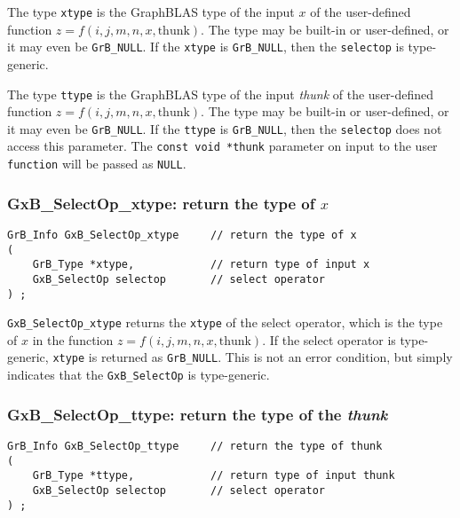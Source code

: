 \documentclass[12pt]{article}
\begin{document}
The type \verb'xtype' is the GraphBLAS type of the input $x$ of the
user-defined function $z=f(i,j,m,n,x,\mbox{thunk})$.  The type may be built-in
or user-defined, or it may even be \verb'GrB_NULL'.  If the \verb'xtype' is
\verb'GrB_NULL', then the \verb'selectop' is type-generic.

The type \verb'ttype' is the GraphBLAS type of the input {\em thunk} of the
user-defined function $z=f(i,j,m,n,x,\mbox{thunk})$.  The type may be built-in
or user-defined, or it may even be \verb'GrB_NULL'.  If the \verb'ttype' is
\verb'GrB_NULL', then the \verb'selectop' does not access this parameter.
The \verb'const void *thunk' parameter on input to the user \verb'function'
will be passed as \verb'NULL'.

\newpage
\subsubsection{{\sf GxB\_SelectOp\_xtype:} return the type of $x$}
\label{selectop_xtype}

\begin{mdframed}[userdefinedwidth=6in]
{\footnotesize
\begin{verbatim}
GrB_Info GxB_SelectOp_xtype     // return the type of x
(
    GrB_Type *xtype,            // return type of input x
    GxB_SelectOp selectop       // select operator
) ;

\end{verbatim}
}\end{mdframed}

\verb'GxB_SelectOp_xtype' returns the \verb'xtype' of the select operator,
which is the type of $x$ in the function $z=f(i,j,m,n,x,\mbox{thunk})$.  If the
select operator is type-generic, \verb'xtype' is returned as \verb'GrB_NULL'.
This is not an error condition, but simply indicates that the
\verb'GxB_SelectOp' is type-generic.

\subsubsection{{\sf GxB\_SelectOp\_ttype:} return the type of the {\em thunk}}
\label{selectop_ttype}

\begin{mdframed}[userdefinedwidth=6in]
{\footnotesize
\begin{verbatim}
GrB_Info GxB_SelectOp_ttype     // return the type of thunk
(
    GrB_Type *ttype,            // return type of input thunk
    GxB_SelectOp selectop       // select operator
) ;

\end{verbatim}
}\end{mdframed}
\end{document}

